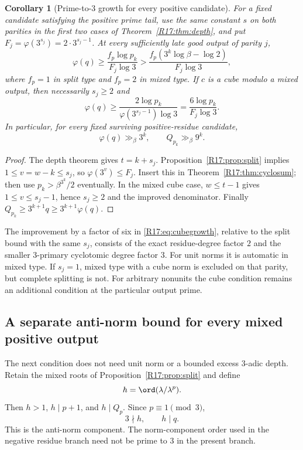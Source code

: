 \documentclass[11pt,a4paper]{article}
\newtheorem{corollary}[theorem]{Corollary}\newtheorem{mainthm}[theorem]{Theorem}
\theoremstyle{definition}\newtheorem{definition}[theorem]{Definition}
\theoremstyle{remark}\newtheorem{remark}[theorem]{Remark}
\begin{document}
\begin{corollary}[Prime-to-$3$ growth for every positive candidate]
\label{R17:cor:positivegrowth}
For a fixed candidate satisfying the positive prime tail, use the same
constant $s$ on both parities in the first two cases of
Theorem~\ref{R17:thm:depth}, and put
$F_j=\varphi(3^{s_j})=2\cdot3^{s_j-1}$.
At every sufficiently late good output of parity $j$,
\begin{equation}\label{R17:eq:positivegrowth}
 \varphi(q)\ge\frac{f_p\log p_k}{F_j\log3}
 >\frac{f_p(3^k\log\beta-\log2)}{F_j\log3},
\end{equation}
where $f_p=1$ in split type and $f_p=2$ in mixed type.
If $c$ is a cube modulo a mixed output, then necessarily $s_j\ge2$ and
\begin{equation}\label{R17:eq:cubegrowth}
 \varphi(q)\ge
 \frac{2\log p_k}{\varphi(3^{s_j-1})\log3}
 =\frac{6\log p_k}{F_j\log3}.
\end{equation}
In particular, for every fixed surviving positive-residue candidate,
\[
 \varphi(q)\gg_\beta3^k,\qquad Q_{p_k}\gg_\beta9^k.
\]
\end{corollary}
\begin{proof}
The depth theorem gives $t=k+s_j$. Proposition~\ref{R17:prop:split} implies
$1\le v=w-k\le s_j$, so $\varphi(3^v)\le F_j$.
Insert this in Theorem~\ref{R17:thm:cyclosum}; then use
$p_k>\beta^{3^k}/2$ eventually.
In the mixed cube case, $w\le t-1$ gives
$1\le v\le s_j-1$, hence $s_j\ge2$ and the improved denominator.
Finally $Q_{p_k}\ge3^{k+1}q\ge3^{k+1}\varphi(q)$.
\end{proof}

The improvement by a factor of six in \eqref{R17:eq:cubegrowth}, relative to
the split bound with the same $s_j$, consists of the exact residue-degree
factor $2$ and the smaller $3$-primary cyclotomic degree factor $3$.
For unit norms it is automatic in mixed type. If $s_j=1$, mixed type
with a cube norm is excluded on that parity, but complete splitting is
not. For arbitrary nonunits the cube condition remains an additional
condition at the particular output prime.


\subsection{A separate anti-norm bound for every mixed positive output}

The next condition does not need unit norm or a bounded excess
$3$-adic depth. Retain the mixed roots of Proposition~\ref{R17:prop:split}
and define
\[
 h=\ord(\lambda/\lambda^p).
\]
Then $h>1$, $h\mid p+1$, and $h\mid Q_p$. Since $p\equiv1\pmod3$,
\begin{equation}\label{R17:eq:anti-divides}
 3\nmid h,\qquad h\mid q.
\end{equation}
This is the anti-norm component. The norm-component order used in the
negative residue branch need not be prime to $3$ in the present branch.
\end{document}
